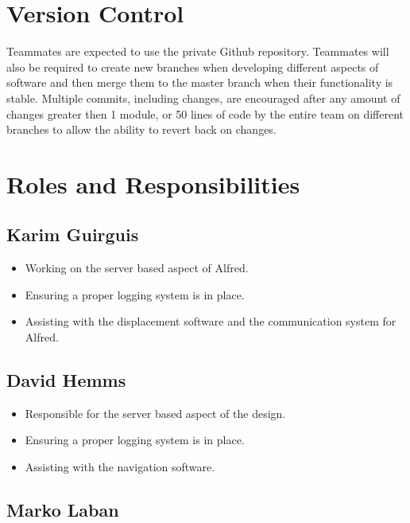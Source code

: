\documentclass [10pt]{article}
\begin{document}
\section{Version Control}

\indent\indent Teammates are expected to use the private Github repository. Teammates will also be required to create new branches when developing different aspects of software and then merge them to the master branch when their functionality is stable. Multiple commits, including changes, are encouraged after any amount of changes greater then 1 module, or 50 lines of code by the entire team on different branches to allow the ability to revert back on changes.


\section{Roles and Responsibilities}

\subsection{Karim Guirguis}
	
	\begin{itemize}
		\item Working on the server based aspect of Alfred.
		\item Ensuring a proper logging system is in place.
		\item Assisting with the displacement software and the communication system for Alfred.
	\end{itemize}

\subsection{David Hemms}

	\begin{itemize}
		\item Responsible for the server based aspect of the design.
		\item Ensuring a proper logging system is in place.
		\item Assisting with the navigation software.
	\end{itemize}
	
\subsection{Marko Laban}
\end{document}
